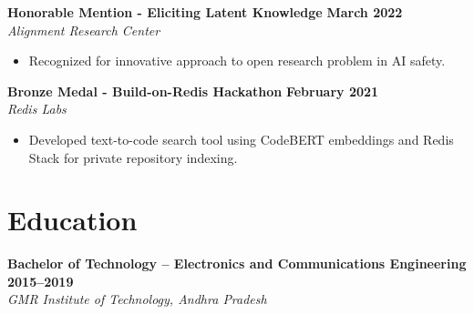 \documentclass[11pt]{article}
\begin{document}
\textbf{Honorable Mention - Eliciting Latent Knowledge} \hfill \textbf{March 2022} \\
\textit{Alignment Research Center}
\begin{itemize}[leftmargin=*, nosep]
\item Recognized for innovative approach to open research problem in AI safety.
\end{itemize}

\textbf{Bronze Medal - Build-on-Redis Hackathon} \hfill \textbf{February 2021} \\
\textit{Redis Labs}
\begin{itemize}[leftmargin=*, nosep]
\item Developed text-to-code search tool using CodeBERT embeddings and Redis Stack for private repository indexing.
\end{itemize}

\section{Education}

\textbf{Bachelor of Technology -- Electronics and Communications Engineering} \hfill \textbf{2015--2019} \\
\textit{GMR Institute of Technology, Andhra Pradesh}
\end{document}
